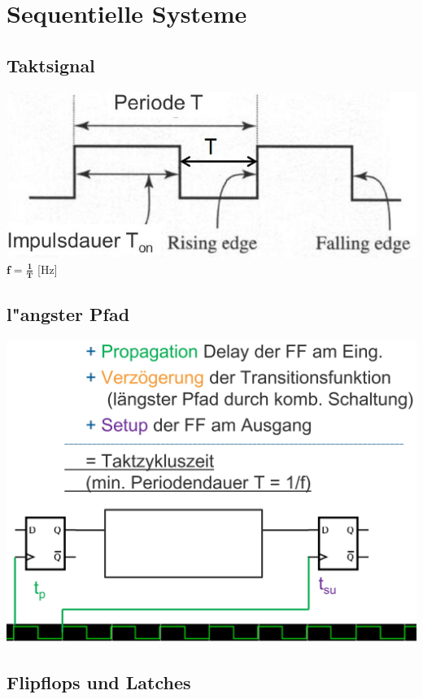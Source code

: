 \section{Sequentielle Systeme}

 \begin{multicols}{2}
	\subsection{Taktsignal}
			\includegraphics[width=0.6\columnwidth]{pics/taktsignal}
			\newline
			$\mathbf{f=\frac{1}{T}}$ [Hz]
			\columnbreak
		\subsection{l"angster Pfad}
			\includegraphics[width=0.5\columnwidth]{pics/laengster_pfad.jpg}
			\columnbreak
	\end{multicols}

\subsection{Flipflops und Latches}
